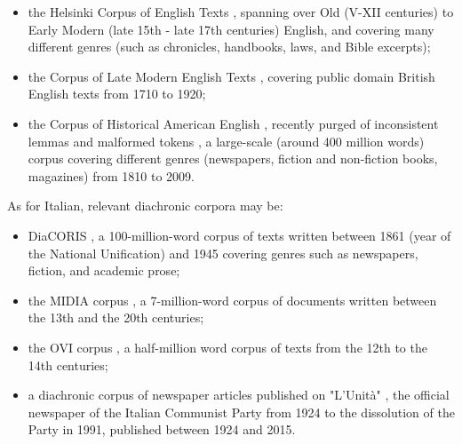 \begin{itemize}
    \item the Helsinki Corpus of English Texts \parencite{rissanen1993helsinki}, spanning over Old (V-XII centuries) to Early Modern (late 15th - late 17th centuries) English, and covering many different genres (such as chronicles, handbooks, laws, and Bible excerpts);
    \item the Corpus of Late Modern English Texts \parencite{deSmet2005corpus, deSmet2015corpus}, covering public domain British English texts from 1710 to 1920;
    \item the Corpus of Historical American English \parencite{davies2010corpus, davies2012expanding}, recently purged of inconsistent lemmas and malformed tokens \parencite{alatrash2020ccoha}, a large-scale (around 400 million words) corpus covering different genres (newspapers, fiction and non-fiction books, magazines) from 1810 to 2009.
\end{itemize}

As for Italian, relevant diachronic corpora may be:
\begin{itemize}
    \item DiaCORIS \parencite{onelli2006diacoris}, a 100-million-word corpus of texts written between 1861 (year of the National Unification) and 1945 covering genres such as newspapers, fiction, and academic prose;
    \item the MIDIA corpus \parencite{gaeta2013midia, iacobini2014midia}, a 7-million-word corpus of documents written between the 13th and the 20th centuries;
    \item the OVI corpus \parencite{ovi2005corpus}, a half-million word corpus of texts from the 12th to the 14th centuries;
    \item a diachronic corpus of newspaper articles published on "L'Unit\`{a}" \parencite{basile2020diachronic}, the official newspaper of the Italian Communist Party from 1924 to the dissolution of the Party in 1991, published between 1924 and 2015.
\end{itemize}



